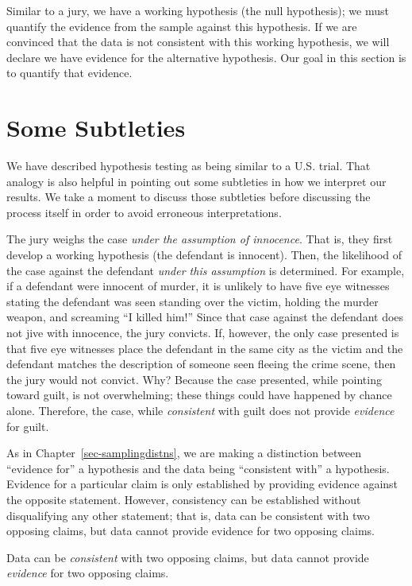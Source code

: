 \documentclass[
  letterpaper,
  DIV=11,
  numbers=noendperiod]{scrreprt}
\theoremstyle{definition}
\theoremstyle{definition}
\theoremstyle{plain}
\theoremstyle{remark}
\begin{document}
Similar to a jury, we have a working hypothesis (the null hypothesis);
we must quantify the evidence from the sample against this hypothesis.
If we are convinced that the data is not consistent with this working
hypothesis, we will declare we have evidence for the alternative
hypothesis. Our goal in this section is to quantify that evidence.

\section{Some Subtleties}\label{some-subtleties}

We have described hypothesis testing as being similar to a U.S. trial.
That analogy is also helpful in pointing out some subtleties in how we
interpret our results. We take a moment to discuss those subtleties
before discussing the process itself in order to avoid erroneous
interpretations.

The jury weighs the case \emph{under the assumption of innocence}. That
is, they first develop a working hypothesis (the defendant is innocent).
Then, the likelihood of the case against the defendant \emph{under this
assumption} is determined. For example, if a defendant were innocent of
murder, it is unlikely to have five eye witnesses stating the defendant
was seen standing over the victim, holding the murder weapon, and
screaming ``I killed him!'' Since that case against the defendant does
not jive with innocence, the jury convicts. If, however, the only case
presented is that five eye witnesses place the defendant in the same
city as the victim and the defendant matches the description of someone
seen fleeing the crime scene, then the jury would not convict. Why?
Because the case presented, while pointing toward guilt, is not
overwhelming; these things could have happened by chance alone.
Therefore, the case, while \emph{consistent} with guilt does not provide
\emph{evidence} for guilt.

As in Chapter~\ref{sec-samplingdistns}, we are making a distinction
between ``evidence for'' a hypothesis and the data being ``consistent
with'' a hypothesis. Evidence for a particular claim is only established
by providing evidence against the opposite statement. However,
consistency can be established without disqualifying any other
statement; that is, data can be consistent with two opposing claims, but
data cannot provide evidence for two opposing claims.

\begin{tcolorbox}[enhanced jigsaw, colbacktitle=quarto-callout-tip-color!10!white, colback=white, left=2mm, title=\textcolor{quarto-callout-tip-color}{\faLightbulb}\hspace{0.5em}{Big Idea}, toptitle=1mm, leftrule=.75mm, breakable, bottomrule=.15mm, arc=.35mm, rightrule=.15mm, toprule=.15mm, coltitle=black, opacityback=0, colframe=quarto-callout-tip-color-frame, opacitybacktitle=0.6, bottomtitle=1mm, titlerule=0mm]

Data can be \emph{consistent} with two opposing claims, but data cannot
provide \emph{evidence} for two opposing claims.

\end{tcolorbox}
\end{document}
